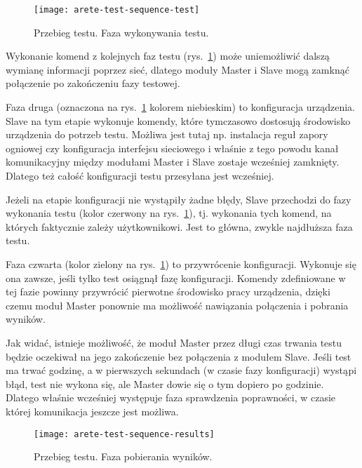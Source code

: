 \documentclass[00-praca-magisterska.tex]{subfiles}
\begin{document}
\begin{figure}
\begin{center}
\leavevmode
\texttt{[image: arete-test-sequence-test]}
\end{center}
\caption{Przebieg testu. Faza wykonywania testu.}
\label{fig:arete-test-seq-test}
\end{figure}

Wykonanie komend z kolejnych faz testu (rys.~\ref{fig:arete-test-seq-test})
może uniemożliwić dalszą wymianę informacji poprzez sieć, dlatego moduły Master
i Slave mogą zamknąć połączenie po zakończeniu fazy testowej.

Faza druga (oznaczona na rys.~\ref{fig:arete-test-seq-test} kolorem niebieskim)
to konfiguracja urządzenia. Slave na tym etapie wykonuje komendy, które
tymczasowo dostosują środowisko urządzenia do potrzeb testu. Możliwa jest tutaj
np. instalacja reguł zapory ogniowej czy konfiguracja interfejsu sieciowego i
właśnie z tego powodu kanał komunikacyjny między modułami Master i Slave
zostaje wcześniej zamknięty. Dlatego też całość konfiguracji testu przesyłana
jest wcześniej.

Jeżeli na etapie konfiguracji nie wystąpiły żadne błędy, Slave przechodzi do
fazy wykonania testu (kolor czerwony na rys.~\ref{fig:arete-test-seq-test}), tj.
wykonania tych komend, na których faktycznie zależy użytkownikowi. Jest to
główna, zwykle najdłuższa faza testu.

Faza czwarta (kolor zielony na rys.~\ref{fig:arete-test-seq-test}) to
przywrócenie konfiguracji. Wykonuje się ona zawsze, jeśli tylko test osiągnął
fazę konfiguracji. Komendy zdefiniowane w tej fazie powinny przywrócić
pierwotne środowisko pracy urządzenia, dzięki czemu moduł Master ponownie ma
możliwość nawiązania połączenia i pobrania wyników.

Jak widać, istnieje możliwość, że moduł Master przez długi czas trwania testu
będzie oczekiwał na jego zakończenie bez połączenia z modułem Slave. Jeśli test
ma trwać godzinę, a w pierwszych sekundach (w czasie fazy konfiguracji) wystąpi
błąd, test nie wykona się, ale Master dowie się o tym dopiero po godzinie.
Dlatego właśnie wcześniej występuje faza sprawdzenia poprawności, w czasie
której komunikacja jeszcze jest możliwa.

\begin{figure}
\begin{center}
\leavevmode
\texttt{[image: arete-test-sequence-results]}
\end{center}
\caption{Przebieg testu. Faza pobierania wyników.}
\label{fig:arete-test-seq-results}
\end{figure}
\end{document}
